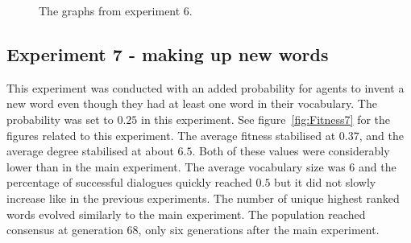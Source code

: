 \begin{figure}[htbp]
    \par \bigskip
    \caption{The graphs from experiment 6.}
    \label{fig:Fitness6}
\end{figure}


\subsection{Experiment 7 - making up new words}
This experiment was conducted with an added probability for agents to invent a new word even though they had at least one word in their vocabulary. The probability was set to $0.25$ in this experiment. See figure~\ref{fig:Fitness7} for the figures related to this experiment. The average fitness stabilised at $0.37$, and the average degree stabilised at about $6.5$. Both of these values were considerably lower than in the main experiment. The average vocabulary size was $6$ and the percentage of successful dialogues quickly reached $0.5$ but it did not slowly increase like in the previous experiments. The number of unique highest ranked words evolved similarly to the main experiment. The population reached consensus at generation $68$, only six generations after the main experiment. 


